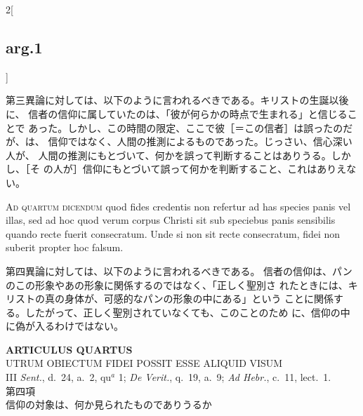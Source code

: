 \documentclass[paper=a4paper,fontsize=10pt,jafontsize=9pt,titlepage]{jlreq}
\begin{document}
\begin{paracol}{2}[\subsection{arg.1}]
\switchcolumn

第三異論に対しては、以下のように言われるべきである。キリストの生誕以後に、
信者の信仰に属していたのは、「彼が何らかの時点で生まれる」と信じることで
あった。しかし、この時間の限定、ここで彼［＝この信者］は誤ったのだが、は、
信仰ではなく、人間の推測によるものであった。じっさい、信心深い人が、
人間の推測にもとづいて、何かを誤って判断することはありうる。しかし、［そ
の人が］信仰にもとづいて誤って何かを判断すること、これはありえない。

\switchcolumn*[\subsection{ad.4}]

{\scshape Ad quartum dicendum} quod fides credentis
non refertur ad has species panis vel illas, sed ad hoc quod verum
corpus Christi sit sub speciebus panis sensibilis quando recte fuerit
consecratum. Unde si non sit recte consecratum, fidei non suberit
propter hoc falsum.

\switchcolumn

第四異論に対しては、以下のように言われるべきである。
信者の信仰は、パンのこの形象やあの形象に関係するのではなく、「正しく聖別さ
 れたときには、キリストの真の身体が、可感的なパンの形象の中にある」という
 ことに関係する。したがって、正しく聖別されていなくても、このことのため
 に、信仰の中に偽が入るわけではない。

\end{paracol}
\newpage


{}
\setcounter{section}{4}
\setcounter{subsection}{0}
\begin{center}
 {\Large {\bfseries ARTICULUS QUARTUS}}\\
 {\large UTRUM OBIECTUM FIDEI POSSIT ESSE ALIQUID VISUM}\\
 {\footnotesize III {\itshape Sent.}, d.~24, a.~2, qu$^a$ 1; {\itshape
 De Verit.}, q.~19, a.~9; {\itshape Ad Hebr.}, c.~11, lect.~1.}\\
 {\Large 第四項\\信仰の対象は、何か見られたものでありうるか}
\end{center}
\end{document}
